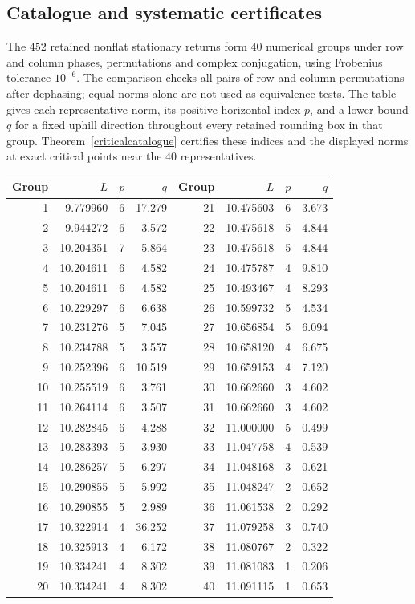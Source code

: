 \documentclass[11pt,a4paper]{article}
\begin{document}
\subsection{Catalogue and systematic certificates}
The $452$ retained nonflat stationary returns form $40$ numerical groups
under row and column phases, permutations and complex conjugation, using
Frobenius tolerance $10^{-6}$. The comparison checks all pairs of row
and column permutations after dephasing; equal norms alone are not
used as equivalence tests. The table gives each representative norm,
its positive horizontal index $p$, and a lower bound $q$ for a fixed
uphill direction throughout every retained rounding box in that group.
Theorem~\ref{criticalcatalogue} certifies these indices and the displayed
norms at exact critical points near the $40$ representatives.
\begin{center}
\begin{tabular}{rrrr@{\qquad}rrrr}
\toprule
Group & $L$ & $p$ & $q$ & Group & $L$ & $p$ & $q$\\
\midrule
1 & 9.779960 & 6 & 17.279 & 21 & 10.475603 & 6 & 3.673\\
2 & 9.944272 & 6 & 3.572 & 22 & 10.475618 & 5 & 4.844\\
3 & 10.204351 & 7 & 5.864 & 23 & 10.475618 & 5 & 4.844\\
4 & 10.204611 & 6 & 4.582 & 24 & 10.475787 & 4 & 9.810\\
5 & 10.204611 & 6 & 4.582 & 25 & 10.493467 & 4 & 8.293\\
6 & 10.229297 & 6 & 6.638 & 26 & 10.599732 & 5 & 4.534\\
7 & 10.231276 & 5 & 7.045 & 27 & 10.656854 & 5 & 6.094\\
8 & 10.234788 & 5 & 3.557 & 28 & 10.658120 & 4 & 6.675\\
9 & 10.252396 & 6 & 10.519 & 29 & 10.659153 & 4 & 7.120\\
10 & 10.255519 & 6 & 3.761 & 30 & 10.662660 & 3 & 4.602\\
11 & 10.264114 & 6 & 3.507 & 31 & 10.662660 & 3 & 4.602\\
12 & 10.282845 & 6 & 4.288 & 32 & 11.000000 & 5 & 0.499\\
13 & 10.283393 & 5 & 3.930 & 33 & 11.047758 & 4 & 0.539\\
14 & 10.286257 & 5 & 6.297 & 34 & 11.048168 & 3 & 0.621\\
15 & 10.290855 & 5 & 5.992 & 35 & 11.048247 & 2 & 0.652\\
16 & 10.290855 & 5 & 2.989 & 36 & 11.061538 & 2 & 0.292\\
17 & 10.322914 & 4 & 36.252 & 37 & 11.079258 & 3 & 0.740\\
18 & 10.325913 & 4 & 6.172 & 38 & 11.080767 & 2 & 0.322\\
19 & 10.334241 & 4 & 8.302 & 39 & 11.081083 & 1 & 0.206\\
20 & 10.334241 & 4 & 8.302 & 40 & 11.091115 & 1 & 0.653\\
\bottomrule
\end{tabular}
\end{center}
\end{document}
